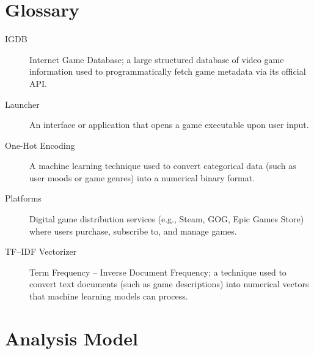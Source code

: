 \clearpage
\section{Glossary}

\begin{description}

\item[IGDB]
Internet Game Database; a large structured database of video game information used to programmatically fetch game metadata via its official API.

\item[Launcher]
An interface or application that opens a game executable upon user input.

\item[One-Hot Encoding]
A machine learning technique used to convert categorical data (such as user moods or game genres) into a numerical binary format.

\item[Platforms]
Digital game distribution services (e.g., Steam, GOG, Epic Games Store) where users purchase, subscribe to, and manage games.

\item[TF--IDF Vectorizer]
Term Frequency – Inverse Document Frequency; a technique used to convert text documents (such as game descriptions) into numerical vectors that machine learning models can process.

\end{description}

\section{Analysis Model}

